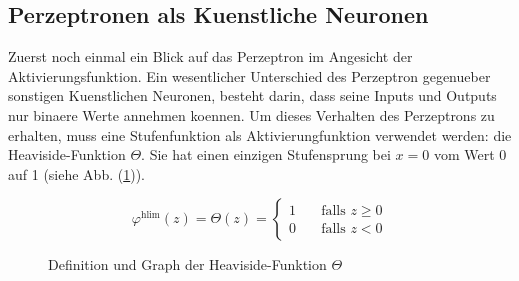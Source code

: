 \subsection{Perzeptronen als Kuenstliche Neuronen}
Zuerst noch einmal ein Blick auf das Perzeptron im Angesicht der Aktivierungsfunktion.
Ein wesentlicher Unterschied des Perzeptron gegenueber sonstigen Kuenstlichen
Neuronen, besteht darin, dass seine Inputs und Outputs nur binaere Werte
annehmen koennen. Um dieses Verhalten des Perzeptrons zu erhalten,
muss eine Stufenfunktion als Aktivierungfunktion verwendet werden: die Heaviside-Funktion $\Theta$.
Sie hat einen einzigen Stufensprung bei $x=0$ vom Wert 0 auf 1 (siehe Abb. (\ref{fig:heaviside})).
\\
\begin{figure}[h!]
  \begin{minipage}[h!]{0.5\textwidth}
    \begin{equation*}
      \varphi^{\text{hlim}}(z) = \Theta(z) =
      \begin{cases}
        1 & \quad \text{falls } z \geq 0\\
        0 & \quad \text{falls } z < 0
      \end{cases}
    \end{equation*}
  \end{minipage}
  \begin{minipage}[h!]{0.5\textwidth}
    \centering
  \end{minipage}
  \caption{Definition und Graph der Heaviside-Funktion $\Theta$}
  \label{fig:heaviside}
\end{figure}

